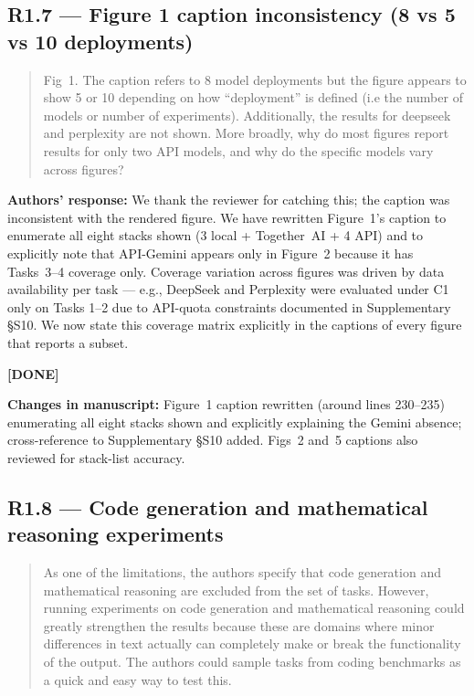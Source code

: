 \documentclass[11pt,a4paper]{article}
\newenvironment{revquote}{%
  \begin{quote}\small\itshape\color{revgray}
}{%
  \end{quote}
}
\newcommand{\response}[1]{\par\noindent\textbf{\color{revgreen}Authors' response:} #1\par}
\newcommand{\changes}[1]{\par\noindent\textbf{\color{revblue}Changes in manuscript:} #1\par}
\newcommand{\done}{\color{revgreen}\textbf{[DONE]}}
\begin{document}
\subsection*{R1.7 --- Figure 1 caption inconsistency (8 vs 5 vs 10 deployments)}

\begin{revquote}
Fig~1. The caption refers to 8 model deployments but the figure appears to show 5 or 10 depending on how ``deployment'' is defined (i.e the number of models or number of experiments). Additionally, the results for deepseek and perplexity are not shown. More broadly, why do most figures report results for only two API models, and why do the specific models vary across figures?
\end{revquote}

\response{We thank the reviewer for catching this; the caption was inconsistent with the rendered figure. We have rewritten Figure~1's caption to enumerate all eight stacks shown (3 local + Together~AI + 4 API) and to explicitly note that API-Gemini appears only in Figure~2 because it has Tasks~3--4 coverage only. Coverage variation across figures was driven by data availability per task --- e.g., DeepSeek and Perplexity were evaluated under C1 only on Tasks 1--2 due to API-quota constraints documented in Supplementary §S10. We now state this coverage matrix explicitly in the captions of every figure that reports a subset.} \done

\changes{Figure~1 caption rewritten (around lines 230--235) enumerating all eight stacks shown and explicitly explaining the Gemini absence; cross-reference to Supplementary §S10 added. Figs~2 and~5 captions also reviewed for stack-list accuracy.}

\subsection*{R1.8 --- Code generation and mathematical reasoning experiments}

\begin{revquote}
As one of the limitations, the authors specify that code generation and mathematical reasoning are excluded from the set of tasks. However, running experiments on code generation and mathematical reasoning could greatly strengthen the results because these are domains where minor differences in text actually can completely make or break the functionality of the output. The authors could sample tasks from coding benchmarks as a quick and easy way to test this.
\end{revquote}
\end{document}
